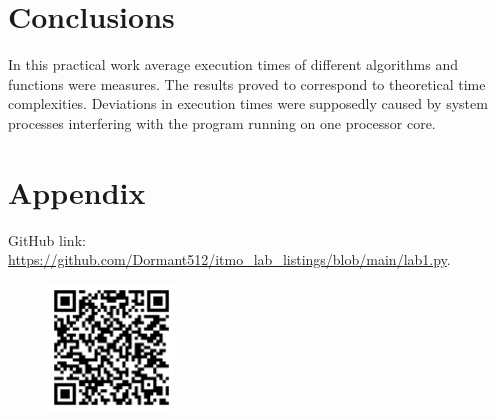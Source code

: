 \documentclass[12pt, a4paper]{article}
\begin{document}
\section*{Conclusions}

In this practical work average execution times of different algorithms and functions were measures. The results proved to correspond to theoretical time complexities. Deviations in execution times were supposedly caused by system processes interfering with the program running on one processor core.

\section*{Appendix}

GitHub link: \url{https://github.com/Dormant512/itmo_lab_listings/blob/main/lab1.py}.

\begin{figure}[!h]
\centering
\includegraphics[width=0.3\textwidth]{qr_lab1.png}
\end{figure}
\end{document}
